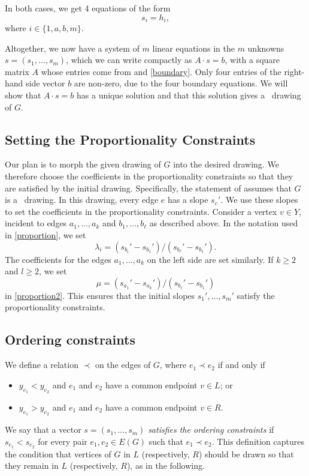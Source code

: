 In both cases, we get 4 equations of the form
\begin{equation}
  \label{eq:boundary}
  s_i = h_i, %
\end{equation}
where $i\in\{1,a,b,m\}$.


Altogether, we now have a system of $m$ linear equations
in the $m$ unknowns $s=(s_1,\ldots,s_m)$, which we can write
compactly as
$A\cdot s = b$, with a square matrix $A$ whose entries come from
\thetag{\ref{eq:slope0}--\ref{eq:proportion2}}
and \eqref{boundary}.
Only four entries of
the right-hand side vector
$b$
are non-zero, due to the four boundary equations.
We will show that $A\cdot s=b$ has a unique
solution and that this solution gives a \Fary\ drawing of $G$.

\subsection{Setting the Proportionality Constraints}
\label{sec:setting}

 Our plan is to morph the given drawing of $G$
into the desired drawing.
We therefore choose the coefficients in the proportionality constraints
so that they are satisfied by the initial drawing.
Specifically, the statement of  assumes that $G$ is a
\Fary\ drawing.  In this drawing, every edge $e$
has a slope $s_e'$.
We use these slopes to set the
coefficients in the proportionality constraints.
Consider a
vertex $v\in Y$, incident to edges $a_1,\ldots,a_k$ and $b_1,\ldots,b_\ell$
as described above.
In the notation used
in \eqref{proportion}, we set
\[
\lambda_i = (s_{b_i}'-s_{b_1}')/(s_{b_\ell}'-s_{b_1}') .
\]
The coefficients for the edges
 $a_1,\ldots,a_k$ on the left side are set similarly.
If $k\ge2$ and $l\ge 2$,
we set
\[
\mu = (s_{a_1}'-s_{a_k}')/(s_{b_\ell}'-s_{b_1}')
\]
 in \eqref{proportion2}.
This ensures that the initial slopes $s_{1}',\ldots,s_{m}'$ satisfy the
proportionality constraints.


\subsection{Ordering constraints}

We define a relation $\prec$ on the edges of $G$, where $e_1 \prec e_2$ if and only if
\begin{itemize}
	\item $y_{e_1} < y_{e_2}$ and $e_1$ and $e_2$ have a common endpoint $v\in L$; or
	\item $y_{e_1} > y_{e_2}$ and $e_1$ and $e_2$ have a common endpoint $v\in R$.
\end{itemize}
We say that a vector $s=(s_1,\ldots,s_m)$ \emph{satisfies the ordering
	constraints} if $s_{e_1} < s_{e_2}$ for every pair $e_1,e_2\in E(G)$
such that $e_1\prec e_2$. This definition captures the condition that vertices of $G$ in $L$ (respectively, $R$) should be drawn so that they remain in $L$ (respectively, $R$), as in the following. 

